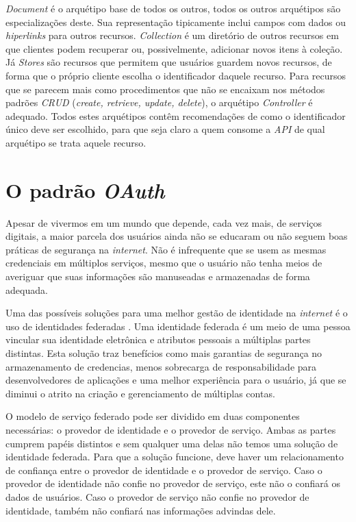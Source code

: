 \emph{Document} é o arquétipo base de todos os outros, todos os outros arquétipos são especializações 
deste. Sua representação tipicamente inclui campos com dados ou \emph{hiperlinks} para outros 
recursos. \emph{Collection} é um diretório de outros recursos em que clientes podem recuperar 
ou, possivelmente, adicionar novos itens à coleção. Já \emph{Stores} são recursos que permitem 
que usuários guardem novos recursos, de forma que o próprio cliente escolha o 
identificador daquele recurso. Para recursos que se parecem mais como procedimentos que 
não se encaixam nos métodos padrões \emph{CRUD} (\emph{create, retrieve, update, delete}),
  o arquétipo \emph{Controller} é adequado. Todos estes arquétipos 
  contêm recomendações de como o identificador único deve ser escolhido, para que seja 
  claro a quem consome a \emph{API} de qual arquétipo se trata aquele recurso.

  \section{O padrão \emph{OAuth}}
  Apesar de vivermos em um mundo que depende, cada vez mais, de serviços digitais,
  a maior parcela dos usuários ainda não se educaram ou 
  não seguem boas práticas de segurança na \emph{internet}. Não é infrequente que se 
  usem as mesmas credenciais em múltiplos serviços, mesmo que o usuário 
  não tenha meios de averiguar que suas informações são manuseadas e armazenadas de forma 
  adequada.

  Uma das possíveis soluções para uma melhor gestão de identidade na \emph{internet} 
  é o uso de identidades federadas \cite{208723}. Uma identidade federada é um meio 
  de uma pessoa vincular sua identidade eletrônica e atributos pessoais 
  a múltiplas partes distintas. Esta solução traz benefícios como mais garantias
  de segurança no armazenamento de credencias, menos sobrecarga de responsabilidade 
  para desenvolvedores de aplicações e uma melhor experiência para o usuário, já que se 
  diminui o atrito na criação e gerenciamento de múltiplas contas.

  O modelo de serviço federado pode ser dividido em duas componentes necessárias: 
  o provedor de identidade e o provedor de serviço. Ambas as partes cumprem papéis 
  distintos e sem qualquer uma delas não temos uma solução de identidade federada. 
  Para que a solução funcione, deve haver um relacionamento de confiança entre 
  o provedor de identidade e o provedor de serviço. Caso o provedor de identidade 
  não confie no provedor de serviço, este não o confiará os dados de usuários.
  Caso o provedor de serviço não confie no provedor de identidade, 
  também não confiará nas informações advindas dele.

